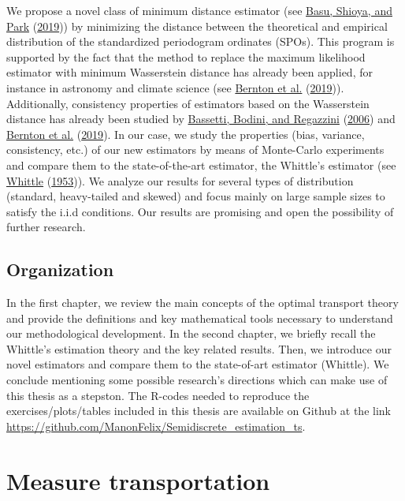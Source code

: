 \documentclass[
  11pt,
]{article}
\begin{document}
We propose a novel class of minimum distance estimator (see
\protect\hyperlink{ref-basu2019statistical}{Basu, Shioya, and Park}
(\protect\hyperlink{ref-basu2019statistical}{2019})) by minimizing the
distance between the theoretical and empirical distribution of the
standardized periodogram ordinates (SPOs). This program is supported by
the fact that the method to replace the maximum likelihood estimator
with minimum Wasserstein distance has already been applied, for instance
in astronomy and climate science (see
\protect\hyperlink{ref-bernton2019parameter}{Bernton et al.}
(\protect\hyperlink{ref-bernton2019parameter}{2019})). Additionally,
consistency properties of estimators based on the Wasserstein distance
has already been studied by
\protect\hyperlink{ref-bassetti2006minimum}{Bassetti, Bodini, and
Regazzini} (\protect\hyperlink{ref-bassetti2006minimum}{2006}) and
\protect\hyperlink{ref-bernton2019parameter}{Bernton et al.}
(\protect\hyperlink{ref-bernton2019parameter}{2019}). In our case, we
study the properties (bias, variance, consistency, etc.) of our new
estimators by means of Monte-Carlo experiments and compare them to the
state-of-the-art estimator, the Whittle's estimator (see
\protect\hyperlink{ref-whittle1953estimation}{Whittle}
(\protect\hyperlink{ref-whittle1953estimation}{1953})). We analyze our
results for several types of distribution (standard, heavy-tailed and
skewed) and focus mainly on large sample sizes to satisfy the i.i.d
conditions. Our results are promising and open the possibility of
further research.

\hypertarget{organization}{%
\subsection{Organization}\label{organization}}

In the first chapter, we review the main concepts of the optimal
transport theory and provide the definitions and key mathematical tools
necessary to understand our methodological development. In the second
chapter, we briefly recall the Whittle's estimation theory and the key
related results. Then, we introduce our novel estimators and compare
them to the state-of-art estimator (Whittle). We conclude mentioning
some possible research's directions which can make use of this thesis as
a stepston. The R-codes needed to reproduce the exercises/plots/tables
included in this thesis are available on Github at the link
\url{https://github.com/ManonFelix/Semidiscrete_estimation_ts}.

\hypertarget{measure-transportation}{%
\section{Measure transportation}\label{measure-transportation}}
\end{document}
